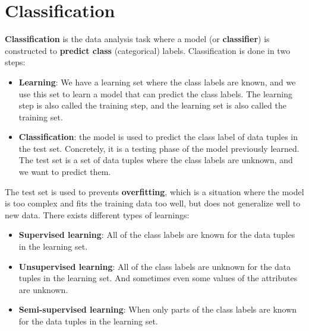 \documentclass[12pt, openany]{report}
\theoremstyle{definition}
\begin{document}
\chapter{Classification}
\textbf{Classification} is the data analysis task where a model (or \textbf{classifier}) is constructed to \textbf{predict class} (categorical) labels. Classification is done in two steps:
\begin{itemize}
    \item \textbf{Learning}: We have a learning set where the class labels are known, and we use this set to learn a model that can predict the class labels. The learning step is also called the training step, and the learning set is also called the training set.
    \item \textbf{Classification}: the model is used to predict the class label of data tuples in the test set. Concretely, it is a testing phase of the model previously learned. The test set is a set of data tuples where the class labels are unknown, and we want to predict them. 
\end{itemize}
The test set is used to prevents \textbf{overfitting}, which is a situation where the model is too complex and fits the training data too well, but does not generalize well to new data.
There exists different types of learnings:
\begin{itemize}
    \item \textbf{Supervised learning}: All of the class labels are known for the data tuples in the learning set. 
    \item \textbf{Unsupervised learning}: All of the class labels are unknown for the data tuples in the learning set. And sometimes even some values of the attributes are unknown. 
    \item \textbf{Semi-supervised learning}: When only parts of the class labels are known for the data tuples in the learning set.
\end{itemize}
\end{document}
